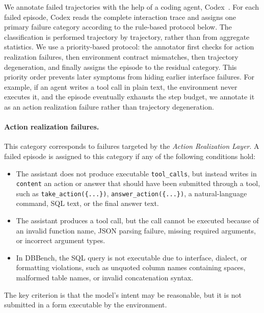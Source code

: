 We annotate failed trajectories with the help of a coding agent, Codex~\cite{openai2026codexcli}. For each failed episode, Codex reads the complete interaction trace and assigns one primary failure category according to the rule-based protocol below. The classification is performed trajectory by trajectory, rather than from aggregate statistics. We use a priority-based protocol: the annotator first checks for action realization failures, then environment contract mismatches, then trajectory degeneration, and finally assigns the episode to the residual category. This priority order prevents later symptoms from hiding earlier interface failures. For example, if an agent writes a tool call in plain text, the environment never executes it, and the episode eventually exhausts the step budget, we annotate it as an action realization failure rather than trajectory degeneration.

\paragraph{Action realization failures.}
This category corresponds to failures targeted by the \emph{Action Realization Layer}. A failed episode is assigned to this category if any of the following conditions hold:
\begin{itemize}
    \item The assistant does not produce executable \texttt{tool\_calls}, but instead writes in \texttt{content} an action or answer that should have been submitted through a tool, such as \texttt{take\_action(\{...\})}, \texttt{answer\_action(\{...\})}, a natural-language command, SQL text, or the final answer text.
    \item The assistant produces a tool call, but the call cannot be executed because of an invalid function name, JSON parsing failure, missing required arguments, or incorrect argument types.
    \item In DBBench, the SQL query is not executable due to interface, dialect, or formatting violations, such as unquoted column names containing spaces, malformed table names, or invalid concatenation syntax.
\end{itemize}
The key criterion is that the model's intent may be reasonable, but it is not submitted in a form executable by the environment.

